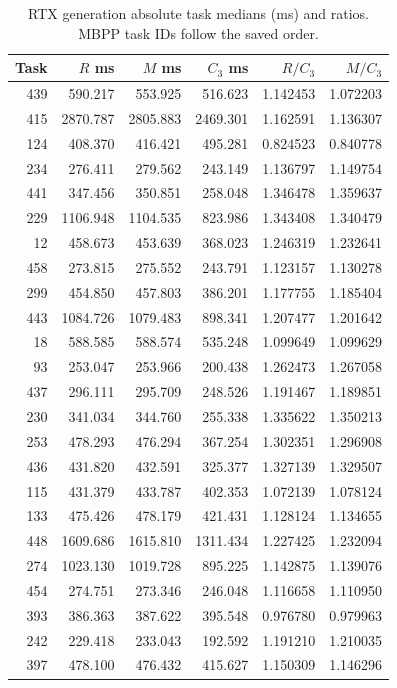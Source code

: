 \begingroup\small
\begin{table}[t]\centering
\caption{RTX generation absolute task medians (ms) and ratios. MBPP task IDs follow the saved order.}\label{tab:rtx_task_generation}
\begin{tabular}{@{}rrrrrr@{}}
\toprule
Task & $R$ ms & $M$ ms & $C_3$ ms & $R/C_3$ & $M/C_3$\\\midrule
439 & 590.217 & 553.925 & 516.623 & 1.142453 & 1.072203\\
415 & 2870.787 & 2805.883 & 2469.301 & 1.162591 & 1.136307\\
124 & 408.370 & 416.421 & 495.281 & 0.824523 & 0.840778\\
234 & 276.411 & 279.562 & 243.149 & 1.136797 & 1.149754\\
441 & 347.456 & 350.851 & 258.048 & 1.346478 & 1.359637\\
229 & 1106.948 & 1104.535 & 823.986 & 1.343408 & 1.340479\\
12 & 458.673 & 453.639 & 368.023 & 1.246319 & 1.232641\\
458 & 273.815 & 275.552 & 243.791 & 1.123157 & 1.130278\\
299 & 454.850 & 457.803 & 386.201 & 1.177755 & 1.185404\\
443 & 1084.726 & 1079.483 & 898.341 & 1.207477 & 1.201642\\
18 & 588.585 & 588.574 & 535.248 & 1.099649 & 1.099629\\
93 & 253.047 & 253.966 & 200.438 & 1.262473 & 1.267058\\
437 & 296.111 & 295.709 & 248.526 & 1.191467 & 1.189851\\
230 & 341.034 & 344.760 & 255.338 & 1.335622 & 1.350213\\
253 & 478.293 & 476.294 & 367.254 & 1.302351 & 1.296908\\
436 & 431.820 & 432.591 & 325.377 & 1.327139 & 1.329507\\
115 & 431.379 & 433.787 & 402.353 & 1.072139 & 1.078124\\
133 & 475.426 & 478.179 & 421.431 & 1.128124 & 1.134655\\
448 & 1609.686 & 1615.810 & 1311.434 & 1.227425 & 1.232094\\
274 & 1023.130 & 1019.728 & 895.225 & 1.142875 & 1.139076\\
454 & 274.751 & 273.346 & 246.048 & 1.116658 & 1.110950\\
393 & 386.363 & 387.622 & 395.548 & 0.976780 & 0.979963\\
242 & 229.418 & 233.043 & 192.592 & 1.191210 & 1.210035\\
397 & 478.100 & 476.432 & 415.627 & 1.150309 & 1.146296\\
\bottomrule\end{tabular}
\end{table}

\endgroup

